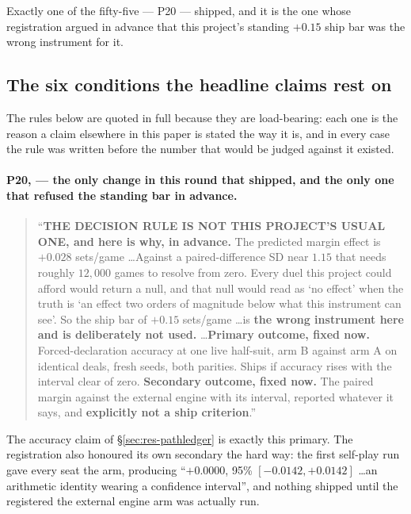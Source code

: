 \noindent Exactly one of the fifty-five --- P20 --- shipped, and it is the
one whose registration argued in advance that this project's standing $+0.15$
ship bar was the wrong instrument for it.

\subsection{The six conditions the headline claims rest on}

The rules below are quoted in full because they are load-bearing: each one is
the reason a claim elsewhere in this paper is stated the way it is, and in
every case the rule was written before the number that would be judged against
it existed.

\paragraph{P20, \protect{} --- the only change in this
round that shipped, and the only one that refused the standing bar in advance.}

\begin{quote}
``\textbf{THE DECISION RULE IS NOT THIS PROJECT'S USUAL ONE, and here is why,
in advance.} The predicted margin effect is $+0.028$ sets/game \ldots Against a
paired-difference SD near $1.15$ that needs roughly $12{,}000$ games to resolve
from zero. Every duel this project could afford would return a null, and that
null would read as `no effect' when the truth is `an effect two orders of
magnitude below what this instrument can see'. So the ship bar of $+0.15$
sets/game \ldots is \textbf{the wrong instrument here and is deliberately not
used.} \ldots \textbf{Primary outcome, fixed now.} Forced-declaration accuracy
at one live half-suit, arm B against arm A on identical deals, fresh seeds,
both parities. Ships if accuracy rises with the interval clear of zero.
\textbf{Secondary outcome, fixed now.} The paired margin against the external engine with its
interval, reported whatever it says, and \textbf{explicitly not a ship
criterion}.''
\end{quote}

\noindent The accuracy claim of \S\ref{sec:res-pathledger} is exactly this
primary. The registration also honoured its own secondary the hard way: the
first self-play run gave every seat the arm, producing ``$+0.0000$, 95\%
$[-0.0142, +0.0142]$ \ldots an arithmetic identity wearing a confidence
interval'', and nothing shipped until the registered the external engine arm was actually run.

